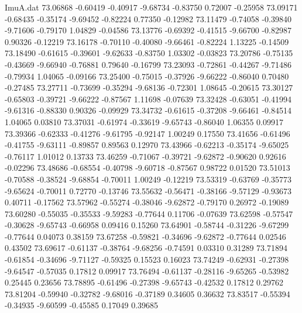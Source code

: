 \begin{filecontents}{ImuA.dat}
  73.06868   -0.60419   -0.40917   -9.68734   -0.83750    0.72007   -0.25958
  73.09171   -0.68435   -0.35174   -9.69452   -0.82224    0.77350   -0.12982
  73.11479   -0.74058   -0.39840   -9.71606   -0.79170    1.04829   -0.04586
  73.13776   -0.69392   -0.41515   -9.66700   -0.82987    0.90326   -0.12219
  73.16178   -0.70110   -0.40080   -9.66461   -0.82224    1.13225   -0.14509
  73.18490   -0.61615   -0.39601   -9.62633   -0.83750    1.03302   -0.03823
  73.20786   -0.75135   -0.43669   -9.66940   -0.76881    0.79640   -0.16799
  73.23093   -0.72861   -0.44267   -9.71486   -0.79934    1.04065   -0.09166
  73.25400   -0.75015   -0.37926   -9.66222   -0.86040    0.70480   -0.27485
  73.27711   -0.73699   -0.35294   -9.68136   -0.72301    1.08645   -0.20615
  73.30127   -0.65803   -0.39721   -9.66222   -0.87567    1.11698   -0.07639
  73.32428   -0.63051   -0.41994   -9.61316   -0.88330    0.90326   -0.09929
  73.34732   -0.61615   -0.37208   -9.66461   -0.84514    1.04065    0.03810
  73.37031   -0.61974   -0.33619   -9.65743   -0.86040    1.06355    0.09917
  73.39366   -0.62333   -0.41276   -9.61795   -0.92147    1.00249    0.17550
  73.41656   -0.61496   -0.41755   -9.63111   -0.89857    0.89563    0.12970
  73.43966   -0.62213   -0.35174   -9.65025   -0.76117    1.01012    0.13733
  73.46259   -0.71067   -0.39721   -9.62872   -0.90620    0.92616   -0.02296
  73.48686   -0.68554   -0.40798   -9.60718   -0.87567    0.98722    0.01520
  73.51013   -0.70588   -0.38524   -9.68854   -0.70011    1.00249   -0.12219
  73.53319   -0.63769   -0.35773   -9.65624   -0.70011    0.72770   -0.13746
  73.55632   -0.56471   -0.38166   -9.57129   -0.93673    0.40711   -0.17562
  73.57962   -0.55274   -0.38046   -9.62872   -0.79170    0.26972   -0.19089
  73.60280   -0.55035   -0.35533   -9.59283   -0.77644    0.11706   -0.07639
  73.62598   -0.57547   -0.30628   -9.65743   -0.66958    0.09416    0.15260
  73.64901   -0.58744   -0.31226   -9.67299   -0.77644    0.04073    0.38159
  73.67258   -0.59821   -0.34696   -9.62872   -0.77644    0.02546    0.43502
  73.69617   -0.61137   -0.38764   -9.68256   -0.74591    0.03310    0.31289
  73.71894   -0.61854   -0.34696   -9.71127   -0.59325    0.15523    0.16023
  73.74249   -0.62931   -0.27398   -9.64547   -0.57035    0.17812    0.09917
  73.76494   -0.61137   -0.28116   -9.65265   -0.53982    0.25445    0.23656
  73.78895   -0.61496   -0.27398   -9.65743   -0.42532    0.17812    0.29762
  73.81204   -0.59940   -0.32782   -9.68016   -0.37189    0.34605    0.36632
  73.83517   -0.55394   -0.34935   -9.60599   -0.45585    0.17049    0.39685

\end{filecontents}
